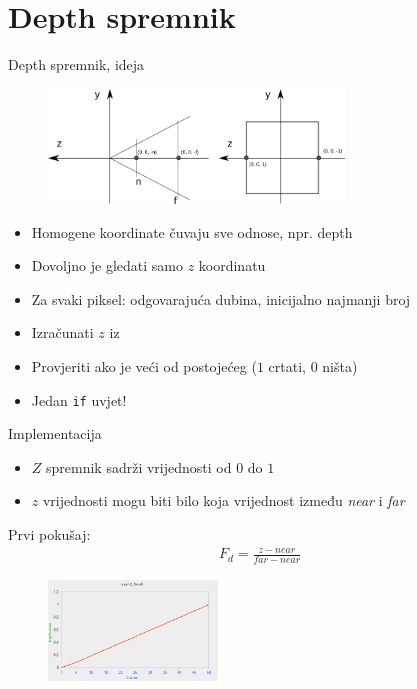 \documentclass[9pt]{beamer}
\begin{document}
\section{Depth spremnik}
\begin{frame}{Depth spremnik, ideja}
	\begin{figure}
		\centering
		\includegraphics[width=0.7\textwidth]{slike/p04_07.png}
	\end{figure}
	\begin{itemize}
		\item Homogene koordinate čuvaju sve odnose, npr. depth
		\item Dovoljno je gledati samo $z$ koordinatu
	\end{itemize}

	\begin{itemize}
		\item Za svaki piksel: odgovarajuća dubina, inicijalno najmanji broj
		\item Izračunati $z$ iz 
		\item Provjeriti ako je veći od postojećeg ($1$ crtati, $0$ ništa)
		\item Jedan \texttt{if} uvjet!
	\end{itemize}
\end{frame}

\begin{frame}{Implementacija}

	\begin{itemize}
		\item $Z$ spremnik sadrži vrijednosti od $0$ do $1$
		\item $z$ vrijednosti mogu biti bilo koja vrijednost između \textit{near} i \textit{far}
	\end{itemize}
Prvi pokušaj:
	\begin{align*}
		F_d = \frac{z-near}{far - near}
	\end{align*}
	\begin{figure}
		\centering
		\includegraphics[width=0.4\textwidth]{slike/depth_linear_graph.png}
	\end{figure}
\end{frame}
\end{document}
